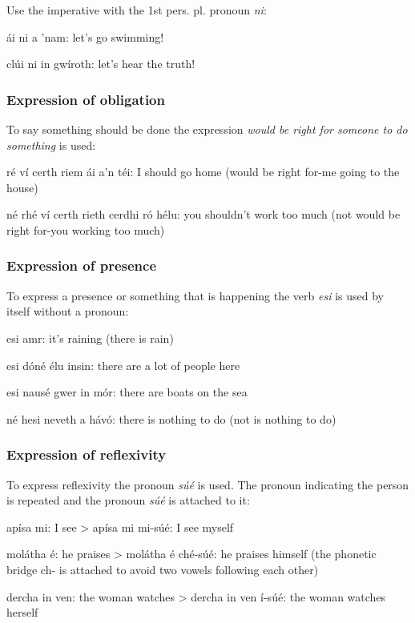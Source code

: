 Use the imperative with the 1st pers. pl. pronoun \textit{ni}:
 
\'{a}i ni a 'nam: let's go swimming!

cl\'{u}i ni in gw\'{i}roth: let's hear the truth!

\subsubsection{Expression of obligation}

To say something should be done the expression \textit{would be right for someone to do something} is used:

r\'{e} v\'{i} certh riem \'{a}i a'n t\'{e}i: I should go home (would be right for-me going to the house)

n\'{e} rh\'{e} v\'{i} certh rieth cerdhi r\'{o} h\'{e}lu: you shouldn't work too much (not would be right for-you working too much)

\subsubsection{Expression of presence}

To express a presence or something that is happening the verb \textit{esi} is used by itself without a pronoun:

esi amr: it's raining (there is rain)

esi d\'{o}n\'{e} \'{e}lu insin: there are a lot of people here

esi naus\'{e} gwer in m\'{o}r: there are boats on the sea

n\'{e} hesi neveth a h\'{a}v\'{o}: there is nothing to do (not is nothing to do)
 
\subsubsection{Expression of reflexivity}

To express reflexivity the pronoun \textit{s\'{u}\'{e}} is used. The pronoun indicating the person is repeated and the pronoun \textit{s\'{u}\'{e}} is attached to it:

ap\'{i}sa mi: I see
> ap\'{i}sa mi mi-s\'{u}\'{e}: I see myself

mol\'{a}tha \'{e}: he praises
> mol\'{a}tha \'{e} ch\'{e}-s\'{u}\'{e}: he praises himself (the phonetic bridge ch- is attached to avoid two vowels following each other)

dercha in ven: the woman watches
> dercha in ven \'{i}-s\'{u}\'{e}: the woman watches herself

